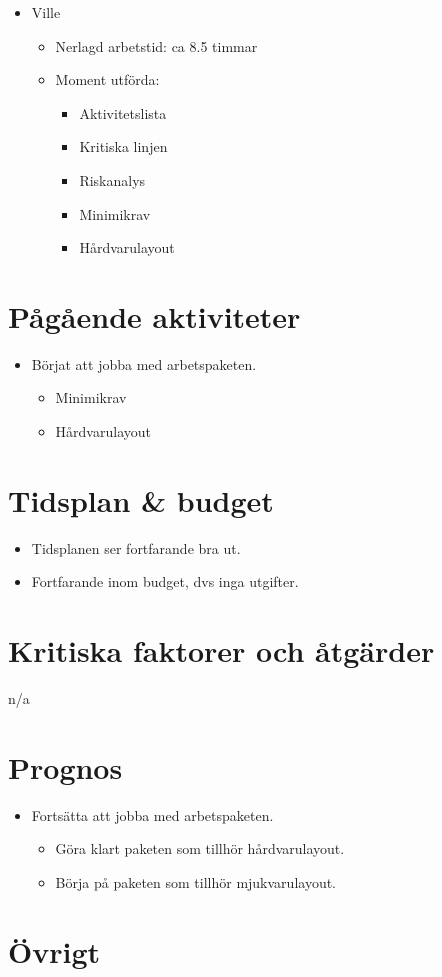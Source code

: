 \begin{itemize}[noitemsep]
\begin{itemize}[noitemsep]
\begin{itemize}[noitemsep]
        \end{itemize}
    \end{itemize}
    \item Ville
    \begin{itemize}[noitemsep]
        \item Nerlagd arbetstid: ca 8.5 timmar
        \item Moment utförda:
        \begin{itemize}[noitemsep]
            \item Aktivitetslista
            \item Kritiska linjen
            \item Riskanalys
            \item Minimikrav
            \item Hårdvarulayout
        \end{itemize}
    \end{itemize}
\end{itemize}

\section{Pågående aktiviteter}
\begin{itemize}[noitemsep]
    \item Börjat att jobba med arbetspaketen.
    \begin{itemize}
    	\item Minimikrav
    	\item Hårdvarulayout
    \end{itemize}
\end{itemize}

\section{Tidsplan \& budget}
\begin{itemize}[noitemsep]
    \item Tidsplanen ser fortfarande bra ut.
    \item Fortfarande inom budget, dvs inga utgifter.
\end{itemize}

\section{Kritiska faktorer och åtgärder}
n/a

\section{Prognos}	
\begin{itemize}[noitemsep]
    \item Fortsätta att jobba med arbetspaketen.
    \begin{itemize}
    	\item Göra klart paketen som tillhör hårdvarulayout.
    	\item Börja på paketen som tillhör mjukvarulayout.
    \end{itemize}
\end{itemize}

\section{Övrigt}

